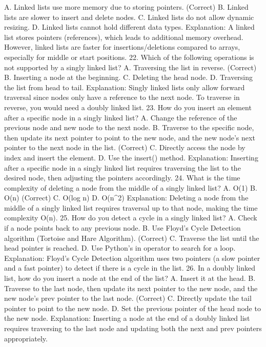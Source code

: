 A. Linked lists use more memory due to storing pointers. (Correct)
B. Linked lists are slower to insert and delete nodes.
C. Linked lists do not allow dynamic resizing.
D. Linked lists cannot hold different data types.
Explanation: A linked list stores pointers (references), which leads to additional memory overhead. However, linked lists are faster for insertions/deletions compared to arrays, especially for middle or start positions.
22. Which of the following operations is not supported by a singly linked list?
A. Traversing the list in reverse. (Correct)
B. Inserting a node at the beginning.
C. Deleting the head node.
D. Traversing the list from head to tail.
Explanation: Singly linked lists only allow forward traversal since nodes only have a reference to the next node. To traverse in reverse, you would need a doubly linked list.
23. How do you insert an element after a specific node in a singly linked list?
A. Change the reference of the previous node and new node to the next node.
B. Traverse to the specific node, then update its next pointer to point to the new node, and the new node's next pointer to the next node in the list. (Correct)
C. Directly access the node by index and insert the element.
D. Use the insert() method.
Explanation: Inserting after a specific node in a singly linked list requires traversing the list to the desired node, then adjusting the pointers accordingly.
24. What is the time complexity of deleting a node from the middle of a singly linked list?
A. O(1)
B. O(n) (Correct)
C. O(log n)
D. O(n^2)
Explanation: Deleting a node from the middle of a singly linked list requires traversal up to that node, making the time complexity O(n).
25. How do you detect a cycle in a singly linked list?
A. Check if a node points back to any previous node.
B. Use Floyd’s Cycle Detection algorithm (Tortoise and Hare Algorithm). (Correct)
C. Traverse the list until the head pointer is reached.
D. Use Python’s in operator to search for a loop.
Explanation: Floyd’s Cycle Detection algorithm uses two pointers (a slow pointer and a fast pointer) to detect if there is a cycle in the list.
26. In a doubly linked list, how do you insert a node at the end of the list?
A. Insert it at the head.
B. Traverse to the last node, then update its next pointer to the new node, and the new node’s prev pointer to the last node. (Correct)
C. Directly update the tail pointer to point to the new node.
D. Set the previous pointer of the head node to the new node.
Explanation: Inserting a node at the end of a doubly linked list requires traversing to the last node and updating both the next and prev pointers appropriately.
